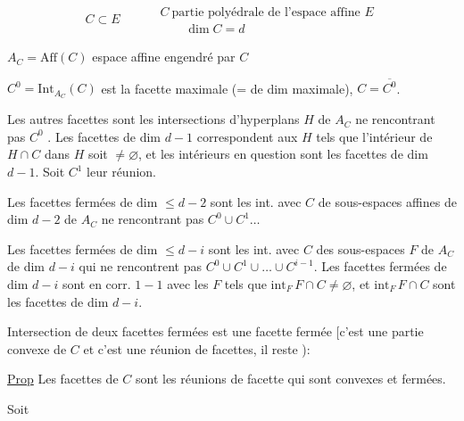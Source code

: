 \[
C\subset E \qquad
\begin{aligned}
&C\ \text{partie polyédrale de l'espace affine }E\\
&\qquad \dim C=d
\end{aligned}
\]

$A_C=\mathrm{Aff}(C)$ espace affine engendré par $C$

$C^0=\mathrm{Int}_{A_C}(C)$ est la facette maximale (= de dim maximale), $C=\overline{C^0}$.

Les autres facettes  sont les intersections  d'hyperplans $H$
de $A_C$ ne rencontrant pas $C^0$ . Les facettes
 de dim $d-1$ correspondent  aux
$H$ tels que l'intérieur de $H\cap C$ dans $H$ soit $\ne\varnothing$,
et les intérieurs en question sont les facettes  de
dim $d-1$. Soit $C^1$ leur réunion.

Les facettes fermées de dim $\leq d-2$ sont les int. avec
$C$ de sous-espaces affines de dim $d-2$ de $A_C$ ne
rencontrant pas $C^0\cup C^1\ldots$

Les facettes fermées de dim $\leq d-i$ sont les int.
 avec $C$ des sous-espaces  $F$ de $A_C$ de dim
$d-i$  qui ne rencontrent pas $C^0\cup C^1\cup\ldots\cup C^{i-1}$.
Les facettes fermées de dim $d-i$ sont en
corr. $1-1$ avec les $F$ tels que $\mathrm{int}_{F}\,F\cap C\ne\varnothing$,
et  $\mathrm{int}_F\,F\cap C$ sont les facettes de dim $d-i$.

Intersection de deux facettes fermées est une
facette fermée [c'est une partie convexe de $C$ et
c'est une réunion de facettes, il reste ):

\uline{Prop} Les facettes  de $C$ sont les réunions
de facette qui sont convexes et fermées.

Soit
